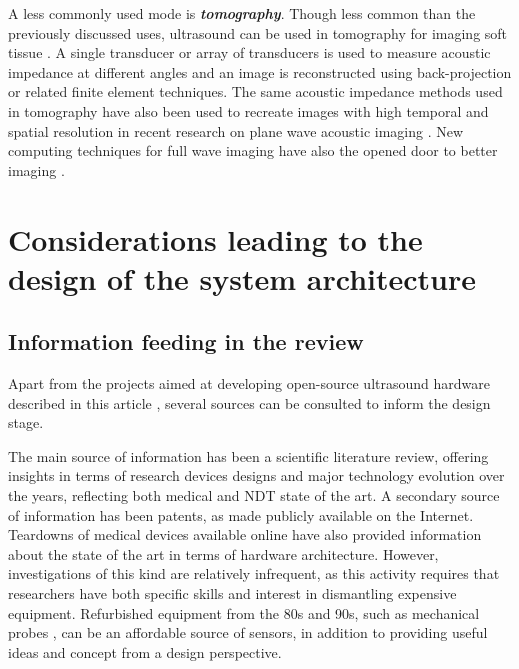 \documentclass{article}
\begin{document}
A less commonly used mode is \textbf{\textit{tomography}}. Though less common than the previously discussed uses, ultrasound can be used in tomography for imaging soft tissue \cite{zhang_design_2015, duric_detection_2007, wen_design_2019, ashfaq_new_2004,marwa_automatic_2019,gemmeke_hardware_2010}. A single transducer or array of transducers is used to measure acoustic impedance at different angles and an image is reconstructed using back-projection or related finite element techniques. The same acoustic impedance methods used in tomography have also been used to recreate images with high temporal and spatial resolution in recent research on plane wave acoustic imaging \cite{Rabut2019,Warner2013}. New computing techniques for full wave imaging have also the opened door to better imaging \cite{guasch_full-waveform_2020, rymarczyk_logistic_2019}. 







\newpage
\section{Considerations leading to the design of the system architecture}


\subsection{Information feeding in the review}

Apart from the projects aimed at developing open-source ultrasound hardware described in this article  \cite{roman_open-source_2019,jonveaux_arduino-like_2017, luc_jonveaux_un0rick_2019}, several sources can be consulted to inform the design stage.

The main source of information has been a scientific literature review, offering insights in terms of research devices designs and major technology evolution over the years, reflecting both medical and NDT state of the art. A secondary source of information has been patents, as made publicly available on the Internet. Teardowns of medical devices available online have also provided information about the state of the art in terms of hardware architecture. However, investigations of this kind are relatively infrequent, as this activity requires that researchers have both specific skills and interest in dismantling expensive equipment. Refurbished equipment from the 80s and 90s, such as mechanical probes \cite{schuette_real_1976,eggleton_real_1975,skolnick_new_1978}, can be an affordable source of sensors, in addition to providing useful ideas and concept  from a design perspective.  
\end{document}
